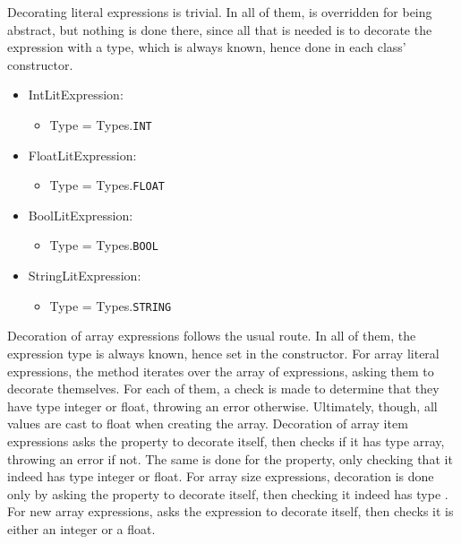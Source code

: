 Decorating literal expressions is trivial. In all of them,  is overridden for being abstract, but nothing is done there, since all that is needed is to decorate the expression with a type, which is always known, hence done in each class' constructor.

\begin{itemize}
	\item IntLitExpression:
		\begin{itemize}
			\item Type = Types.\texttt{INT}
		\end{itemize}
	\item FloatLitExpression:
		\begin{itemize}
			\item Type = Types.\texttt{FLOAT}
		\end{itemize}
	\item BoolLitExpression:
		\begin{itemize}
			\item Type = Types.\texttt{BOOL}
		\end{itemize}
	\item StringLitExpression:
		\begin{itemize}
			\item Type = Types.\texttt{STRING}
		\end{itemize}
\end{itemize}

Decoration of array expressions follows the usual route. In all of them, the expression type is always known, hence set in the constructor. For array literal expressions, the  method iterates over the array of expressions, asking them to decorate themselves. For each of them, a check is made to determine that they have type integer or float, throwing an error otherwise. Ultimately, though, all values are cast to float when creating the array. Decoration of array item expressions asks the  property to decorate itself, then checks if it has type array, throwing an error if not. The same is done for the  property, only checking that it indeed has type integer or float. For array size expressions, decoration is done only by asking the  property to decorate itself, then checking it indeed has type . For new array expressions,  asks the  expression to decorate itself, then checks it is either an integer or a float.

